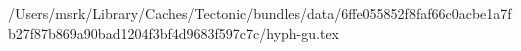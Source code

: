 /Users/msrk/Library/Caches/Tectonic/bundles/data/6ffe055852f8faf66c0acbe1a7fb27f87b869a90bad1204f3bf4d9683f597c7c/hyph-gu.tex